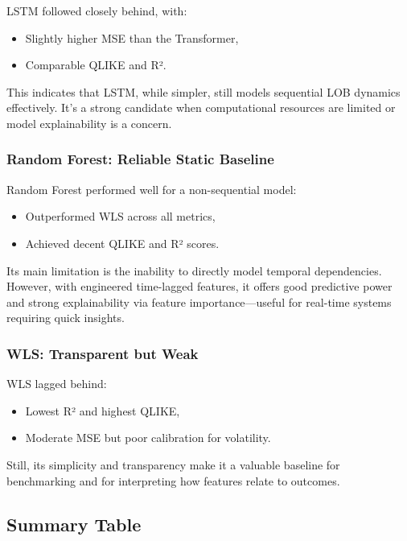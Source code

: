 \documentclass[
  letterpaper,
  DIV=11,
  numbers=noendperiod]{scrartcl}
\providecommand{\tightlist}{%
  \setlength{\itemsep}{0pt}\setlength{\parskip}{0pt}}\usepackage{longtable,booktabs,array}
\begin{document}
LSTM followed closely behind, with:

\begin{itemize}
\tightlist
\item
  Slightly higher MSE than the Transformer,
\item
  Comparable QLIKE and R².
\end{itemize}

This indicates that LSTM, while simpler, still models sequential LOB
dynamics effectively. It's a strong candidate when computational
resources are limited or model explainability is a concern.

\subsubsection{Random Forest: Reliable Static
Baseline}\label{random-forest-reliable-static-baseline}

Random Forest performed well for a non-sequential model:

\begin{itemize}
\tightlist
\item
  Outperformed WLS across all metrics,
\item
  Achieved decent QLIKE and R² scores.
\end{itemize}

Its main limitation is the inability to directly model temporal
dependencies. However, with engineered time-lagged features, it offers
good predictive power and strong explainability via feature
importance---useful for real-time systems requiring quick insights.

\subsubsection{WLS: Transparent but
Weak}\label{wls-transparent-but-weak}

WLS lagged behind:

\begin{itemize}
\tightlist
\item
  Lowest R² and highest QLIKE,
\item
  Moderate MSE but poor calibration for volatility.
\end{itemize}

Still, its simplicity and transparency make it a valuable baseline for
benchmarking and for interpreting how features relate to outcomes.

\subsection{Summary Table}\label{summary-table}
\end{document}

